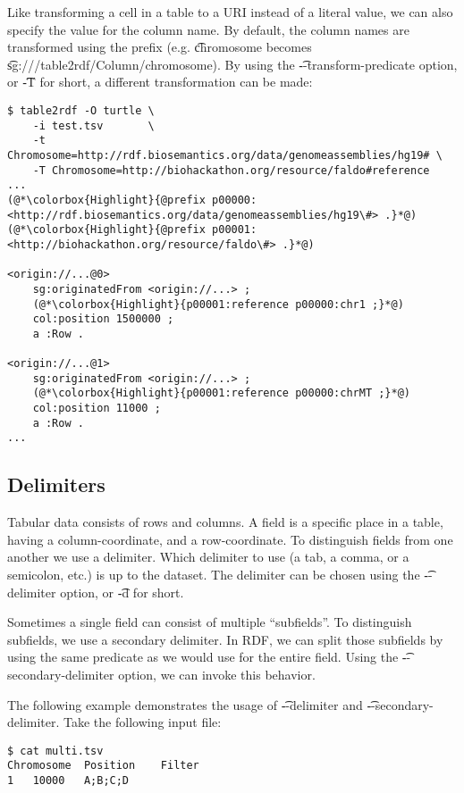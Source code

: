   Like transforming a cell in a table to a URI instead of a literal value,
  we can also specify the value for the column name.  By default, the column
  names are transformed using the  prefix (e.g.
  \t{chromosome} becomes
  \t{sg://\sgversion{}/table2rdf/Column/chromosome}).  By using
  the \t{-{}-transform-predicate} option, or \t{-T} for short, a
  different transformation can be made:

\begin{lstlisting}
$ table2rdf -O turtle \
    -i test.tsv       \
    -t Chromosome=http://rdf.biosemantics.org/data/genomeassemblies/hg19# \
    -T Chromosome=http://biohackathon.org/resource/faldo#reference
...
(@*\colorbox{Highlight}{@prefix p00000: <http://rdf.biosemantics.org/data/genomeassemblies/hg19\#> .}*@)
(@*\colorbox{Highlight}{@prefix p00001: <http://biohackathon.org/resource/faldo\#> .}*@)

<origin://...@0>
    sg:originatedFrom <origin://...> ;
    (@*\colorbox{Highlight}{p00001:reference p00000:chr1 ;}*@)
    col:position 1500000 ;
    a :Row .

<origin://...@1>
    sg:originatedFrom <origin://...> ;
    (@*\colorbox{Highlight}{p00001:reference p00000:chrMT ;}*@)
    col:position 11000 ;
    a :Row .
...
\end{lstlisting}

\subsection{Delimiters}

  Tabular data consists of rows and columns.  A field is a specific place in
  a table, having a column-coordinate, and a row-coordinate.  To distinguish
  fields from one another we use a delimiter.  Which delimiter to use (a tab,
  a comma, or a semicolon, etc.) is up to the dataset.  The delimiter
  can be chosen using the \t{-{}-delimiter} option, or \t{-d} for
  short.

  Sometimes a single field can consist of multiple ``subfields''.  To
  distinguish subfields, we use a secondary delimiter.  In RDF, we can split
  those subfields by using the same predicate as we would use for the entire
  field.  Using the \t{-{}-secondary-delimiter} option, we can invoke
  this behavior.

  The following example demonstrates the usage of \t{-{}-delimiter} and
  \t{-{}-secondary-delimiter}.  Take the following input file:

\begin{lstlisting}
$ cat multi.tsv
Chromosome	Position	Filter
1	10000	A;B;C;D
\end{lstlisting}

